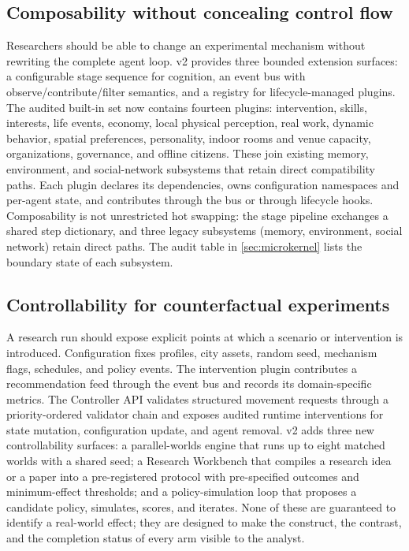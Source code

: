 \subsection{Composability without concealing control flow}
\label{sec:dgo:composability}

Researchers should be able to change an experimental mechanism without
rewriting the complete agent loop.  v2 provides three bounded extension
surfaces: a configurable stage sequence for cognition, an event bus with
observe/contribute/filter semantics, and a registry for lifecycle-managed
plugins.  The audited built-in set now contains fourteen plugins: intervention,
skills, interests, life events, economy, local physical perception, real
work, dynamic behavior, spatial preferences, personality, indoor rooms and
venue capacity, organizations, governance, and offline citizens.  These join
existing memory, environment, and social-network subsystems that retain direct
compatibility paths.  Each plugin declares its dependencies, owns
configuration namespaces and per-agent state, and contributes through the bus
or through lifecycle hooks.  Composability is not unrestricted hot swapping:
the stage pipeline exchanges a shared step dictionary, and three legacy
subsystems (memory, environment, social network) retain direct paths.  The
audit table in \cref{sec:microkernel} lists the boundary state of each
subsystem.

\subsection{Controllability for counterfactual experiments}
\label{sec:dgo:controllability}

A research run should expose explicit points at which a scenario or
intervention is introduced.  Configuration fixes profiles, city assets,
random seed, mechanism flags, schedules, and policy events.  The
intervention plugin contributes a recommendation feed through the event bus
and records its domain-specific metrics.  The Controller API validates
structured movement requests through a priority-ordered validator chain and
exposes audited runtime interventions for state mutation, configuration
update, and agent removal.  v2 adds three new controllability surfaces: a
parallel-worlds engine that runs up to eight matched worlds with a shared
seed; a Research Workbench that compiles a research idea or a paper into a
pre-registered protocol with pre-specified outcomes and minimum-effect
thresholds; and a policy-simulation loop that proposes a candidate policy,
simulates, scores, and iterates.  None of these are guaranteed to identify a
real-world effect; they are designed to make the construct, the contrast, and
the completion status of every arm visible to the analyst.

